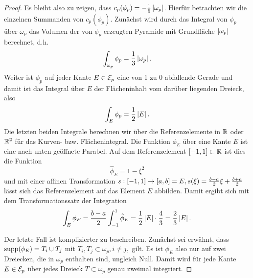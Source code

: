 \begin{proof}
Es bleibt also zu zeigen, dass $c_p(\phi_p) = -\frac 1 6 \, \lvert \omega_p\rvert$. Hierfür betrachten wir die einzelnen Summanden von $c_p(\phi_p)$. Zunächst wird durch das Integral von $\phi_p$ über $\omega_p$ das Volumen der von $\phi_p$ erzeugten Pyramide mit Grundfläche $\lvert \omega_p\rvert$ berechnet, d.h.
\begin{align}\label{eq:4.35}
	\int_{\omega_p} \phi_p = \frac 13 \, \lvert \omega_p\rvert \, .
\end{align}
Weiter ist $\phi_p$ auf jeder Kante $E \in \mathcal E_p$ eine von 1 zu 0 abfallende Gerade und damit ist das Integral über $E$ der Flächeninhalt vom darüber liegenden Dreieck, also
\begin{align}\label{eq:4.36}
	\int_E \phi_p = \frac 1 2 \, \lvert E\rvert \, .
\end{align}
Die letzten beiden Integrale berechnen wir über die Referenzelemente in $\mathbb{R}$ oder $\mathbb{R}^2$ für das Kurven- bzw. Flächenintegral. Die Funktion $\phi_E$ über eine Kante $E$ ist eine nach unten geöffnete Parabel. Auf dem Referenzelement $[-1,1]\subset\mathbb{R}$ ist dies die Funktion
\[
	\hat \phi_E = 1-\xi^2 
\]
und mit einer affinen Transformation $s: [-1,1]\rightarrow [a,b] = E, s(\xi) = \frac{b-a}2 \xi + \frac{b+a}2$ lässt sich das Referenzelement auf das Element $E$ abbilden. Damit ergibt sich mit dem Transformationssatz der Integration
\begin{align}\label{eq:4.37}
	\int_E \phi_E = \frac{b-a}2 \int_{-1}^1 \hat\phi_E = \frac 12 \, \lvert E\rvert \cdot \frac 43 = \frac 23 \, \lvert E\rvert\, .
\end{align}

Der letzte Fall ist komplizierter zu beschreiben. Zunächst sei erwähnt, dass $\operatorname{supp} (\phi_E) = T_i \cup T_j$ mit $T_i,T_j \subset \omega_p, i\not=j,$ gilt. Es ist $\phi_E$ also nur auf zwei Dreiecken, die in $\omega_p$ enthalten sind, ungleich Null. Damit wird für jede Kante $E \in \mathcal E_p$ über jedes Dreieck $T \subset \omega_p$ genau zweimal integriert.


\end{proof}
